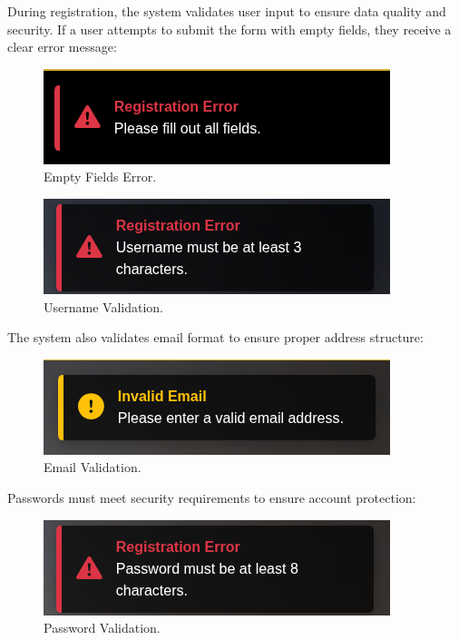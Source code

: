 During registration, the system validates user input to ensure data quality and security. If a user attempts to submit the form with empty fields, they receive a clear error message:

\begin{figure}[H]
    \centering
    \includegraphics[width=0.6\linewidth]{Figures/images/new_images/ErrorFillOutAllTheFields.png}
    \caption{Empty Fields Error.} %
    \label{fig:error-empty-fields-wireframe}
\end{figure}

\begin{figure}[H]
    \centering
    \includegraphics[width=0.6\linewidth]{Figures/images/new_images/ErrorUserName.png}
    \caption{Username Validation.} %
    \label{fig:error-username-wireframe}
\end{figure}

The system also validates email format to ensure proper address structure:

\begin{figure}[H]
    \centering
    \includegraphics[width=0.6\linewidth]{Figures/images/new_images/ErrorEmail.png}
    \caption{Email Validation.} %
    \label{fig:error-email-wireframe}
\end{figure}

Passwords must meet security requirements to ensure account protection:

\begin{figure}[H]
    \centering
    \includegraphics[width=0.6\linewidth]{Figures/images/new_images/ErrorPassword.png}
    \caption{Password Validation.} %
    \label{fig:error-password-wireframe}
\end{figure}

